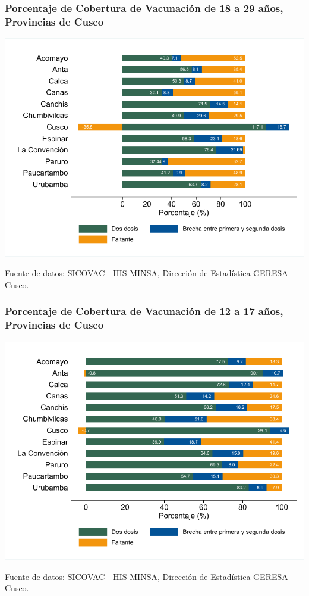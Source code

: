 \documentclass[xcolor=table]{beamer}
\begin{document}
\begin{frame}[label=vacunas_30]
	\frametitle{Porcentaje de Cobertura de Vacunación de 18 a 29 años, Provincias de Cusco}
	\vspace{-.5cm}
	\begin{center}
		\includegraphics[width=0.8\linewidth, trim={.2cm .5cm .2cm .2cm},clip]{../figuras/vacunacion_provincial_edad_3.pdf}
	\end{center}
	{\tiny Fuente de datos: SICOVAC - HIS MINSA, Dirección de Estadística GERESA Cusco. \\}
\hyperlink{cobertura_vacuna_provincias}{}
\end{frame}

\begin{frame}[label=vacunas_20]
	\frametitle{Porcentaje de Cobertura de Vacunación de 12 a 17 años, Provincias de Cusco}
	\vspace{-.5cm}
	\begin{center}
		\includegraphics[width=0.8\linewidth, trim={.2cm .5cm .2cm .2cm},clip]{../figuras/vacunacion_provincial_edad_2.pdf}
	\end{center}
	{\tiny Fuente de datos: SICOVAC - HIS MINSA, Dirección de Estadística GERESA Cusco. \\}
\hyperlink{cobertura_vacuna_provincias}{}

\end{frame}
\end{document}
